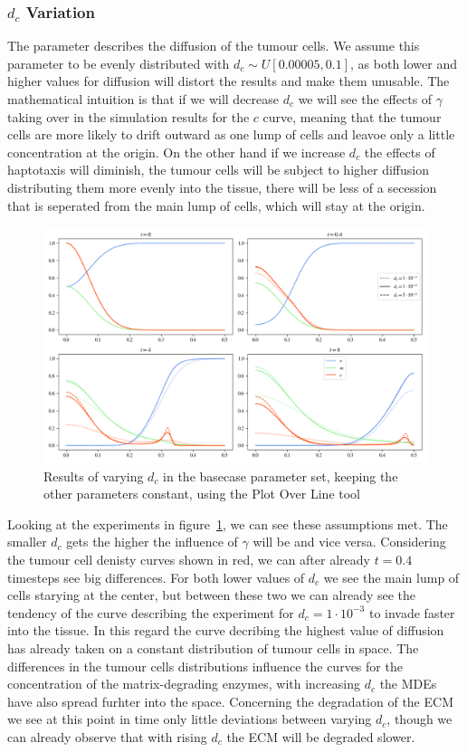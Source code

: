 \subsubsection*{$d_c$ Variation}
The parameter describes the diffusion of the tumour cells. We assume this parameter to be evenly distributed with $d_c \sim U[0.00005,0.1]$, as both lower and higher values for diffusion will distort the results and make them unusable.\newline 
The mathematical intuition is that if we will decrease $d_c$ we will see the effects of $\gamma$ taking over in the simulation results for the $c$ curve, meaning that the tumour cells are more likely to drift outward as one lump of cells and leavoe only a little concentration at the origin. On the other hand if we increase $d_c$ the effects of haptotaxis will diminish, the tumour cells will be subject to higher diffusion distributing them more evenly into the tissue, there will be less of a secession that is seperated from the main lump of cells, which will stay at the origin. 
\begin{figure}[h]
    \centering
    \includegraphics[width=\textwidth]{resources/images/dc_variation.png}
    \caption{Results of varying $d_c$ in the basecase parameter set, keeping the other parameters constant, using the Plot Over Line tool}
    \label{fig:dc_variation}
\end{figure}
Looking at the experiments in figure~\ref{fig:dc_variation}, we can see these assumptions met. The smaller $d_c$ gets the higher the influence of $\gamma$ will be and vice versa. 
Considering the tumour cell denisty curves shown in red, we can after already $t=0.4$ timesteps see big differences. For both lower values of $d_c$ we see the main lump of cells starying at the center, but between these two we can already see the tendency of the curve describing the experiment for $d_c=1\cdot 10^{-3}$ to invade faster into the tissue. In this regard the curve decribing the highest value of diffusion has already taken on a constant distribution of tumour cells in space. The differences in the tumour cells distributions influence the curves for the concentration of the matrix-degrading enzymes, with increasing $d_c$ the MDEs have also spread furhter into the space. Concerning the degradation of the ECM we see at this point in time only little deviations between varying $d_c$, though  we can already observe that with rising $d_c$ the ECM will be degraded slower. \newline
